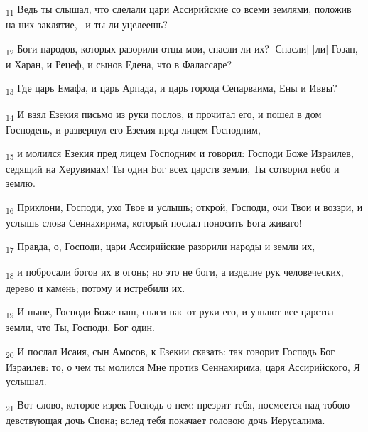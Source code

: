 \begin{tcolorbox}
\textsubscript{11} Ведь ты слышал, что сделали цари Ассирийские со всеми землями, положив на них заклятие, --и ты ли уцелеешь?
\end{tcolorbox}
\begin{tcolorbox}
\textsubscript{12} Боги народов, которых разорили отцы мои, спасли ли их? [Спасли] [ли] Гозан, и Харан, и Рецеф, и сынов Едена, что в Фалассаре?
\end{tcolorbox}
\begin{tcolorbox}
\textsubscript{13} Где царь Емафа, и царь Арпада, и царь города Сепарваима, Ены и Иввы?
\end{tcolorbox}
\begin{tcolorbox}
\textsubscript{14} И взял Езекия письмо из руки послов, и прочитал его, и пошел в дом Господень, и развернул его Езекия пред лицем Господним,
\end{tcolorbox}
\begin{tcolorbox}
\textsubscript{15} и молился Езекия пред лицем Господним и говорил: Господи Боже Израилев, седящий на Херувимах! Ты один Бог всех царств земли, Ты сотворил небо и землю.
\end{tcolorbox}
\begin{tcolorbox}
\textsubscript{16} Приклони, Господи, ухо Твое и услышь; открой, Господи, очи Твои и воззри, и услышь слова Сеннахирима, который послал поносить Бога живаго!
\end{tcolorbox}
\begin{tcolorbox}
\textsubscript{17} Правда, о, Господи, цари Ассирийские разорили народы и земли их,
\end{tcolorbox}
\begin{tcolorbox}
\textsubscript{18} и побросали богов их в огонь; но это не боги, а изделие рук человеческих, дерево и камень; потому и истребили их.
\end{tcolorbox}
\begin{tcolorbox}
\textsubscript{19} И ныне, Господи Боже наш, спаси нас от руки его, и узнают все царства земли, что Ты, Господи, Бог один.
\end{tcolorbox}
\begin{tcolorbox}
\textsubscript{20} И послал Исаия, сын Амосов, к Езекии сказать: так говорит Господь Бог Израилев: то, о чем ты молился Мне против Сеннахирима, царя Ассирийского, Я услышал.
\end{tcolorbox}
\begin{tcolorbox}
\textsubscript{21} Вот слово, которое изрек Господь о нем: презрит тебя, посмеется над тобою девствующая дочь Сиона; вслед тебя покачает головою дочь Иерусалима.
\end{tcolorbox}
